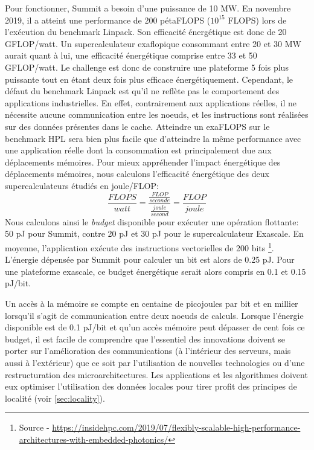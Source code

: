     
            Pour fonctionner, Summit a besoin d'une puissance de 10 MW. En novembre 2019, il a atteint une performance de 200 pétaFLOPS ($10^{15}$ \gls{FLOPS}) lors de l'exécution du benchmark Linpack. Son efficacité énergétique est donc de 20 GFLOP/watt. Un supercalculateur exaflopique consommant entre 20 et 30 MW aurait quant à lui, une efficacité énergétique comprise entre 33 et 50 GFLOP/watt. Le challenge est donc de construire une plateforme 5 fois plus puissante tout en étant deux fois plus efficace énergétiquement. Cependant, le défaut du benchmark Linpack est qu'il ne reflète pas le comportement des applications industrielles. En effet, contrairement aux applications réelles, il ne nécessite aucune communication entre les noeuds, et les instructions sont réalisées sur des données présentes dans le cache. Atteindre un exaFLOPS sur le benchmark HPL sera bien plus facile que d'atteindre la même performance avec une application réelle dont la consommation est principalement due aux déplacements mémoires. Pour mieux appréhender l'impact énergétique des déplacements mémoires, nous calculons l'efficacité énergétique des deux supercalculateurs étudiés en joule/FLOP:
            \begin{equation}
                 \frac{FLOPS}{watt}  =  \frac{\frac{FLOP}{seconde}}  { \frac{joule}{second}} =  \frac{FLOP}{joule}
            \end{equation}
            Nous calculons ainsi le \textit{budget} disponible pour exécuter une opération flottante: 50 pJ pour Summit, contre 20 pJ et 30 pJ pour le supercalculateur Exascale. En moyenne, l'application exécute des instructions vectorielles de 200 bits \footnote{Source - \url{https://insidehpc.com/2019/07/flexibly-scalable-high-performance-architectures-with-embedded-photonics/}}. L'énergie dépensée par Summit pour calculer un bit est alors de 0.25 pJ. Pour une plateforme exascale, ce budget énergétique serait alors compris en 0.1 et 0.15 pJ/bit.
            
            Un accès à la mémoire se compte en centaine de picojoules par bit et en millier lorsqu'il s'agit de communication entre deux noeuds de calculs. Lorsque l'énergie disponible est de 0.1 pJ/bit et qu'un accès mémoire peut dépasser de cent fois ce budget, il est facile de comprendre que l'essentiel des innovations doivent se porter sur l'amélioration des communications (à l'intérieur des serveurs, mais aussi à l'extérieur) que ce soit par l'utilisation de nouvelles technologies ou d'une restructuration des microarchitectures. Les applications et les algorithmes doivent eux optimiser l'utilisation des données locales pour tirer profit des principes de localité (voir \autoref{sec:locality}).


